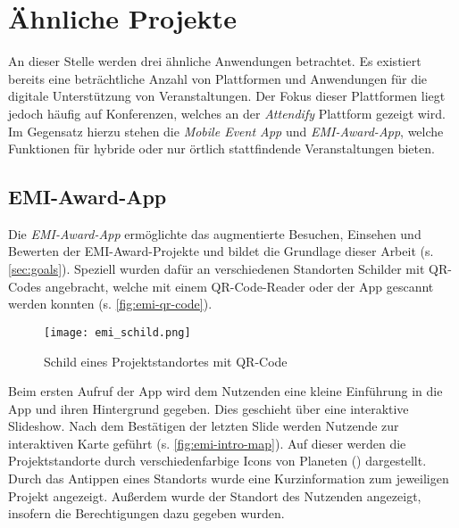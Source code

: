 

\section{Ähnliche Projekte}

An dieser Stelle werden drei ähnliche Anwendungen betrachtet. Es existiert
bereits eine beträchtliche Anzahl von Plattformen und Anwendungen für die
digitale Unterstützung von Veranstaltungen. Der Fokus dieser Plattformen liegt
jedoch häufig auf Konferenzen, welches an der \textit{Attendify} Plattform
gezeigt wird. Im Gegensatz hierzu stehen die \textit{Mobile Event App} und
\textit{EMI-Award-App}, welche Funktionen für hybride oder nur örtlich
stattfindende Veranstaltungen bieten.

\subsection{EMI-Award-App}



Die \textit{EMI-Award-App} ermöglichte das augmentierte Besuchen, Einsehen und
Bewerten der EMI-Award-Projekte und bildet die Grundlage dieser Arbeit (s.
\autoref{sec:goals}). Speziell wurden dafür an verschiedenen Standorten Schilder
mit QR-Codes angebracht, welche mit einem QR-Code-Reader oder der App gescannt
werden konnten (s. \autoref{fig:emi-qr-code}).

\begin{figure}[htpb]
    \centering
    \texttt{[image: emi\_schild.png]}
    \caption{Schild eines Projektstandortes mit QR-Code}
    \label{fig:emi-qr-code}
\end{figure}

Beim ersten Aufruf der App wird dem Nutzenden eine kleine Einführung in die App
und ihren Hintergrund gegeben. Dies geschieht über eine interaktive Slideshow.
Nach dem Bestätigen der letzten Slide werden Nutzende zur interaktiven Karte
geführt (s. \autoref{fig:emi-intro-map}). Auf dieser werden die Projektstandorte
durch verschiedenfarbige Icons von Planeten ()
dargestellt. Durch das Antippen eines Standorts wurde eine Kurzinformation zum
jeweiligen Projekt angezeigt. Außerdem wurde der Standort des Nutzenden
angezeigt, insofern die Berechtigungen dazu gegeben wurden.

